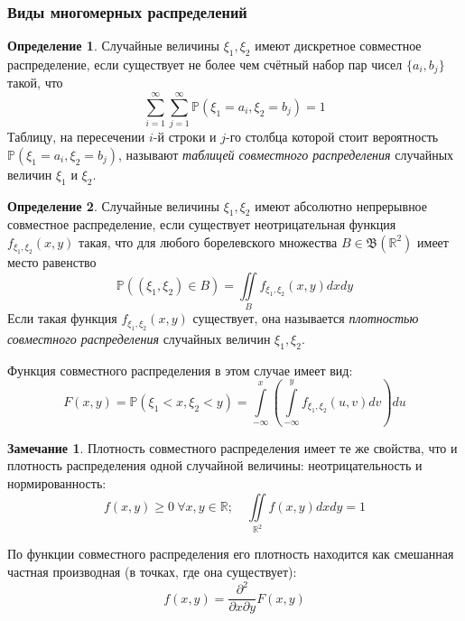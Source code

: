 \documentclass[oneside,final,14pt]{extreport}
\theoremstyle{plain}
\theoremstyle{definition}
\newtheorem*{defn}{Определение}
\newtheorem*{rmrk}{Замечание}
\theoremstyle{named}
\begin{document}
\subsubsection{Виды многомерных распределений}

\begin{defn}
    Случайные величины $\xi_1, \xi_2$ имеют дискретное совместное распределение, если существует не более чем счётный набор пар чисел $\{a_{i}, b_{j}\}$ такой, что
    \begin{equation*}
        \sum\limits_{i=1}^{\infty} \sum\limits_{j=1}^{\infty} \mathbb{P}\left(\xi_{1}=a_{i}, \xi_{2}=b_{j}\right)=1
    \end{equation*}
    Таблицу, на пересечении $i$-й строки и $j$-го столбца которой стоит вероятность $\mathbb{P}\left(\xi_{1}=a_{i}, \xi_{2}=b_{j}\right)$, называют {\it таблицей совместного распределения} случайных величин $\xi_1$ и $\xi_2$.
\end{defn}
\begin{defn}
    Случайные величины $\xi_1, \xi_2$ имеют абсолютно непрерывное совместное распределение, если существует неотрицательная функция $f_{\xi_{1}, \xi_{2}}(x, y)$ такая, что для любого борелевского множества $B \in \mathfrak{B}\left(\mathbb{R}^{2}\right)$ имеет место равенство
    \begin{equation*}
        \mathbb{P}\left(\left(\xi_{1}, \xi_{2}\right) \in B\right)=\iint\limits_{B} f_{\xi_{1}, \xi_{2}}(x, y) d x d y
    \end{equation*}
    Если такая функция $f_{\xi_{1}, \xi_{2}}(x, y)$ существует, она называется {\it плотностью совместного распределения} случайных величин $\xi_1, \xi_2$.
    
    Функция совместного распределения в этом случае имеет вид:
    \begin{equation*}
        F(x, y)=\mathbb{P}(\xi_{1}<x, \xi_{2}<y)=\int\limits_{-\infty}^{x}\left(\int\limits_{-\infty}^{y} f_{\xi_{1}, \xi_{2}}(u, v) d v\right) d u
    \end{equation*}
\end{defn}

\begin{rmrk}
    Плотность совместного распределения имеет те же свойства, что и плотность распределения одной случайной величины: неотрицательность и нормированность:
    \begin{equation*}
        f(x, y) \geqslant 0~ \forall x,y \in \mathbb{R}; \quad \iint\limits_{\mathbb{R}^{2}} f(x, y) dx dy = 1
    \end{equation*}

    По функции совместного распределения его плотность находится как смешанная частная производная (в точках, где она существует):
    \begin{equation*}
        f(x, y)=\frac{\partial^{2}}{\partial x \partial y} F(x, y)
    \end{equation*}
\end{rmrk}
\end{document}

